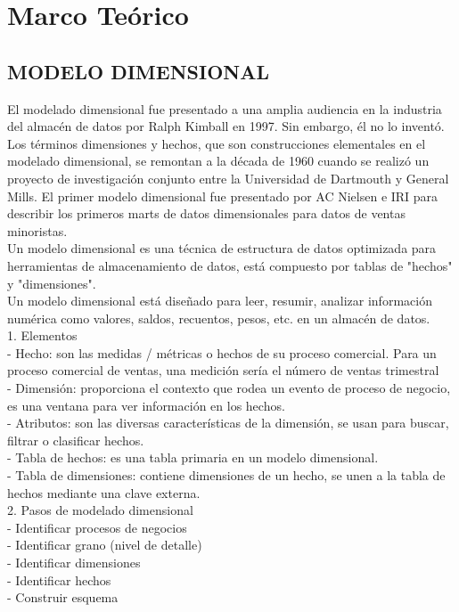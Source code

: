 \documentclass[%
 reprint,
 amsmath,amssymb,
 aps,
]{revtex4-1}
\begin{document}
\section {Marco Teórico}

\subsection{MODELO DIMENSIONAL}

El modelado dimensional fue presentado a una amplia audiencia en la industria del almacén de datos por Ralph Kimball en 1997. Sin embargo, él no lo inventó. Los términos dimensiones y hechos, que son construcciones elementales en el modelado dimensional, se remontan a la década de 1960 cuando se realizó un proyecto de investigación conjunto entre la Universidad de Dartmouth y General Mills. El primer modelo dimensional fue presentado por AC Nielsen e IRI para describir los primeros marts de datos dimensionales para datos de ventas minoristas.\\
Un modelo dimensional es una técnica de estructura de datos optimizada para herramientas de almacenamiento de datos, está compuesto por tablas de "hechos" y "dimensiones".\\
Un modelo dimensional está diseñado para leer, resumir, analizar información numérica como valores, saldos, recuentos, pesos, etc. en un almacén de datos. \\

1. Elementos \\
- Hecho: son las medidas / métricas o hechos de su proceso comercial. Para un proceso comercial de ventas, una medición sería el número de ventas trimestral \\
- Dimensión: proporciona el contexto que rodea un evento de proceso de negocio, es una ventana para ver información en los hechos. \\
- Atributos: son las diversas características de la dimensión, se usan para buscar, filtrar o clasificar hechos. \\
- Tabla de hechos: es una tabla primaria en un modelo dimensional. \\
- Tabla de dimensiones: contiene dimensiones de un hecho, se unen a la tabla de hechos mediante una clave externa. \\

2. Pasos de modelado dimensional \\
- Identificar procesos de negocios \\
- Identificar grano (nivel de detalle) \\
- Identificar dimensiones \\
- Identificar hechos \\
- Construir esquema \\
\end{document}
